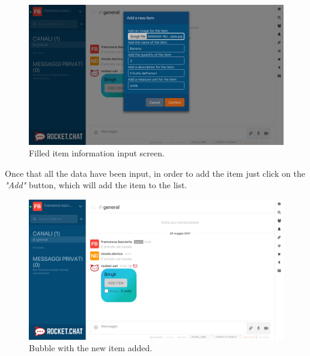 \begin{figure}[H]
  \centering 
  \includegraphics[width=\textwidth]{Sections/3-HowToUse/Images/item_add_filled.png}
  \caption{Filled item information input screen.}
\end{figure}

Once that all the data have been input, in order to add the item just click on the \textit{"Add"} button, which will add the item to the list.

\begin{figure}[H]
  \centering 
  \includegraphics[width=\textwidth]{Sections/3-HowToUse/Images/bubble_item_added.png}
  \caption{Bubble with the new item added.}
\end{figure}